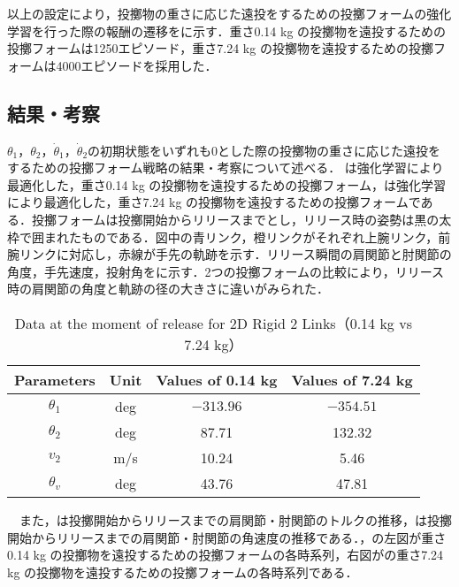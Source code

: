 以上の設定により，投擲物の重さに応じた遠投をするための投擲フォームの強化学習を行った際の報酬の遷移をに示す．重さ0.14 kg の投擲物を遠投するための投擲フォームは1250エピソード，重さ7.24 kg の投擲物を遠投するための投擲フォームは4000エピソードを採用した．

\subsection{結果・考察}
$\theta_{1}$，$\theta_{2}$，$\dot{\theta}_{1}$，$\dot{\theta}_{2}$の初期状態をいずれも0とした際の投擲物の重さに応じた遠投をするための投擲フォーム戦略の結果・考察について述べる．
は強化学習により最適化した，重さ0.14 kg の投擲物を遠投するための投擲フォーム，は強化学習により最適化した，重さ7.24 kg の投擲物を遠投するための投擲フォームである．投擲フォームは投擲開始からリリースまでとし，リリース時の姿勢は黒の太枠で囲まれたものである．図中の青リンク，橙リンクがそれぞれ上腕リンク，前腕リンクに対応し，赤線が手先の軌跡を示す．リリース瞬間の肩関節と肘関節の角度，手先速度，投射角をに示す．2つの投擲フォームの比較により，リリース時の肩関節の角度と軌跡の径の大きさに違いがみられた．\\
\begin{table}[tb]
  \begin{center}
    \caption{Data at the moment of release for 2D Rigid 2 Links（0.14 kg vs 7.24 kg）}
    \begin{tabular}{c|c|c|c}
      \hline
      Parameters & Unit & Values of 0.14 kg & Values of 7.24 kg \\
      \hline
      $\theta_{1}$ & deg & $-313.96$ & $-354.51$ \\
      $\theta_{2}$ & deg & 87.71 & 132.32 \\
      $v_{2}$ & m/s & 10.24 & 5.46 \\
      $\theta_{v}$ & deg & 43.76 & 47.81 \\
      \hline
    \end{tabular}
  \end{center}
\end{table}
　また，は投擲開始からリリースまでの肩関節・肘関節のトルクの推移，は投擲開始からリリースまでの肩関節・肘関節の角速度の推移である．，の左図が重さ0.14 kg の投擲物を遠投するための投擲フォームの各時系列，右図がの重さ7.24 kg の投擲物を遠投するための投擲フォームの各時系列である．\\
